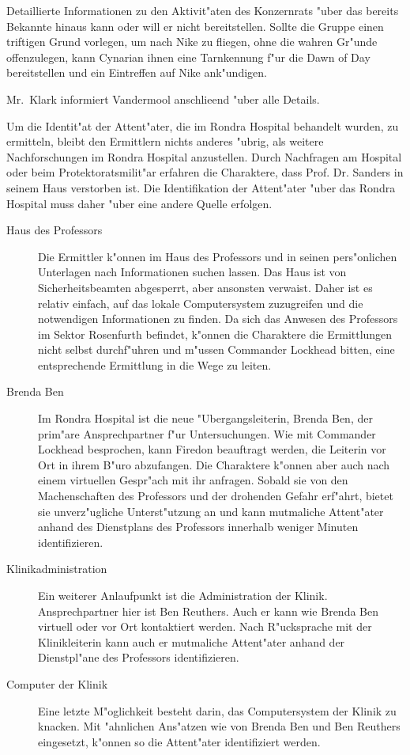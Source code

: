 Detaillierte Informationen zu den Aktivit"aten des Konzernrats "uber das bereits Bekannte hinaus kann oder will er nicht bereitstellen. Sollte die Gruppe einen triftigen Grund vorlegen, um nach Nike zu fliegen, ohne die wahren Gr"unde offenzulegen, kann Cynarian ihnen eine Tarnkennung f"ur die Dawn of Day bereitstellen und ein Eintreffen auf Nike ank"undigen.

Mr.~Klark informiert Vandermool anschlie\3end "uber alle Details.


Um die Identit"at der Attent"ater, die im Rondra Hospital behandelt wurden, zu ermitteln, bleibt den Ermittlern nichts anderes "ubrig, als weitere Nachforschungen im Rondra Hospital anzustellen. Durch Nachfragen am Hospital oder beim Protektoratsmilit"ar erfahren die Charaktere, dass Prof. Dr. Sanders in seinem Haus verstorben ist. Die Identifikation der Attent"ater "uber das Rondra Hospital muss daher "uber eine andere Quelle erfolgen.

\begin{description}
	\item[Haus des Professors] Die Ermittler k"onnen im Haus des Professors und in seinen pers"onlichen Unterlagen nach Informationen suchen 
		lassen. Das Haus ist von Sicherheitsbeamten abgesperrt, aber ansonsten verwaist. Daher ist es relativ einfach, auf das lokale Computersystem zuzugreifen und die notwendigen Informationen zu finden. Da sich das Anwesen des Professors im Sektor Rosenfurth befindet, k"onnen die Charaktere die Ermittlungen nicht selbst durchf"uhren und m"ussen Commander Lockhead bitten, eine entsprechende Ermittlung in die Wege zu leiten.
	\item[Brenda Ben] Im Rondra Hospital ist die neue "Ubergangsleiterin, Brenda Ben, der prim"are Ansprechpartner f"ur Untersuchungen. Wie 
		mit Commander Lockhead besprochen, kann Firedon beauftragt werden, die Leiterin vor Ort in ihrem B"uro abzufangen. Die Charaktere k"onnen aber auch nach einem virtuellen Gespr"ach mit ihr anfragen. Sobald sie von den Machenschaften des Professors und der drohenden Gefahr erf"ahrt, bietet sie unverz"ugliche Unterst"utzung an und kann mutma\3liche Attent"ater anhand des Dienstplans des Professors innerhalb weniger Minuten identifizieren.
	\item[Klinikadministration] Ein weiterer Anlaufpunkt ist die Administration der Klinik. Ansprechpartner hier ist Ben Reuthers. Auch er 
		kann wie Brenda Ben virtuell oder vor Ort kontaktiert werden. Nach R"ucksprache mit der Klinikleiterin kann auch er mutma\3liche Attent"ater anhand der Dienstpl"ane des Professors identifizieren.
	\item[Computer der Klinik] Eine letzte M"oglichkeit besteht darin, das Computersystem der Klinik zu knacken. Mit "ahnlichen Ans"atzen wie 
		von Brenda Ben und Ben Reuthers eingesetzt, k"onnen so die Attent"ater identifiziert werden.
\end{description}

